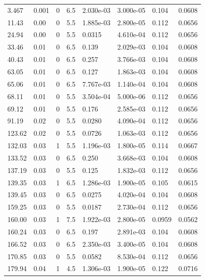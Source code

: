 \documentclass[preview]{standalone}
\begin{document}
{{\begin{tabular}{L{1.2cm}C{1.2cm} C{0.3cm}C{0.5cm} C{1.4cm}C{1.4cm} C{1.4cm}C{1.4cm}}
  3.467  &  0.001  & 0     & 6.5 &  2.030e-03  & 3.000e-05  & 0.104 &  0.0608   \\ 
  11.43  &  0.00  & 0     & 5.5 &  1.885e-03  & 2.800e-05  & 0.112 &  0.0656   \\ 
  24.94  &  0.00  & 0     & 5.5 &  0.0315  & 4.610e-04  & 0.112 &  0.0656   \\ 
  33.46  &  0.01  & 0     & 6.5 &  0.139  & 2.029e-03  & 0.104 &  0.0608   \\ 
  40.43  &  0.01  & 0     & 6.5 &  0.257  & 3.766e-03  & 0.104 &  0.0608   \\ 
  63.05  &  0.01  & 0     & 6.5 &  0.127  & 1.863e-03  & 0.104 &  0.0608   \\ 
  65.06  &  0.01  & 0     & 6.5 &  7.767e-03  & 1.140e-04  & 0.104 &  0.0608   \\ 
  68.11  &  0.01  & 0     & 5.5 &  3.504e-04  & 5.000e-06  & 0.112 &  0.0656   \\ 
  69.12  &  0.01  & 0     & 5.5 &  0.176  & 2.585e-03  & 0.112 &  0.0656   \\ 
  91.19  &  0.02  & 0     & 5.5 &  0.0280  & 4.090e-04  & 0.112 &  0.0656   \\ 
  123.62  &  0.02  & 0     & 5.5 &  0.0726  & 1.063e-03  & 0.112 &  0.0656   \\ 
  132.03  &  0.03  & 1     & 5.5 &  1.196e-03  & 1.800e-05  & 0.114 &  0.0667   \\ 
  133.52  &  0.03  & 0     & 6.5 &  0.250  & 3.668e-03  & 0.104 &  0.0608   \\ 
  137.19  &  0.03  & 0     & 5.5 &  0.125  & 1.832e-03  & 0.112 &  0.0656   \\ 
  139.35  &  0.03  & 1     & 6.5 &  1.286e-03  & 1.900e-05  & 0.105 &  0.0615   \\ 
  139.45  &  0.03  & 0     & 6.5 &  0.0275  & 4.020e-04  & 0.104 &  0.0608   \\ 
  159.25  &  0.03  & 0     & 5.5 &  0.0187  & 2.730e-04  & 0.112 &  0.0656   \\ 
  160.00  &  0.03  & 1     & 7.5 &  1.922e-03  & 2.800e-05  & 0.0959 &  0.0562   \\ 
  160.24  &  0.03  & 0     & 6.5 &  0.197  & 2.891e-03  & 0.104 &  0.0608   \\ 
  166.52  &  0.03  & 0     & 6.5 &  2.350e-03  & 3.400e-05  & 0.104 &  0.0608   \\ 
  170.85  &  0.03  & 0     & 5.5 &  0.0582  & 8.530e-04  & 0.112 &  0.0656   \\ 
  179.94  &  0.04  & 1     & 4.5 &  1.306e-03  & 1.900e-05  & 0.122 &  0.0716   \\ 

\end{tabular}}}
\end{document}

